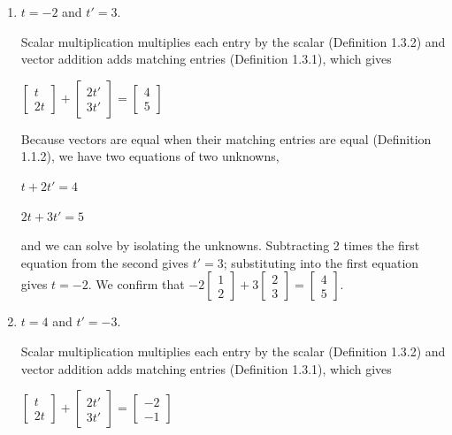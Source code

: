 \begin{solution}
\begin{enumerate}
  \item
  	 \begin{answer}
         $t = -2$ and $ t' = 3$.
       \end{answer}
       Scalar multiplication multiplies each entry by the scalar (Definition 1.3.2) and vector addition adds matching entries (Definition 1.3.1), which gives
       
       $\begin{bmatrix} t \\ 2t \end{bmatrix} +
       \begin{bmatrix} 2t' \\ 3t' \end{bmatrix} =
       \begin{bmatrix} 4 \\ 5 \end{bmatrix}$
       
       Because vectors are equal when their matching entries are equal (Definition 1.1.2), we have two equations of two unknowns,
       
       $t + 2t' = 4$
       
       $2t + 3t' = 5$
       
       and we can solve by isolating the unknowns. Subtracting 2 times the first equation from the second gives $t' = 3$; substituting into the first equation gives $t = -2$. We confirm that  $-2\begin{bmatrix} 1 \\ 2 \end{bmatrix} + 3\begin{bmatrix} 2 \\ 3 \end{bmatrix}  = \begin{bmatrix} 4 \\ 5 \end{bmatrix}$.

       
       
  \item \begin{answer}
         $t = 4$ and $ t' = -3$.
       \end{answer}
      Scalar multiplication multiplies each entry by the scalar (Definition 1.3.2) and vector addition adds matching entries (Definition 1.3.1), which gives
       
       $\begin{bmatrix} t \\ 2t \end{bmatrix} +
       \begin{bmatrix} 2t' \\ 3t' \end{bmatrix} =
       \begin{bmatrix} -2 \\ -1 \end{bmatrix}$
       

\end{enumerate}
\end{solution}
